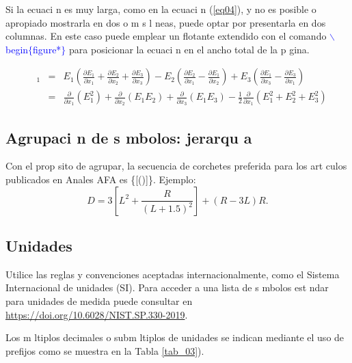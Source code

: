 \documentclass{article}
\begin{document}
Si la ecuaci n es muy larga, como en la ecuaci n (\ref{eq04}), y no es posible o apropiado mostrarla en dos o m s l neas, puede optar por presentarla en dos columnas. En este caso puede emplear un flotante extendido con el comando \textcolor{Blue}{\textsf{$\backslash$begin$\{$figure*$\}$}}
para posicionar la ecuaci n en el ancho total de la p gina.

\begin{figure}
\begin{eqnarray}
[\mathbf{E}(\mathbf{\nabla . E}) - \mathbf{E}\times (\mathbf{\nabla \times E})]_{1}  & = & 
E_{1}\left( \frac{\partial E_{1}}{\partial x_{1}} +  \frac{\partial E_{2}}{\partial x_{2}} + \frac{\partial E_{3}}{\partial x_{3}} \right) 
- E_{2}\left( \frac{\partial E_{2}}{\partial x_{1}} -  \frac{\partial E_{1}}{\partial x_{2}} \right)
+ E_{3}\left( \frac{\partial E_{1}}{\partial x_{3}} -  \frac{\partial E_{3}}{\partial x_{1}} \right)
\nonumber\\
 & = & \frac{\partial}{\partial x_{1}}(E_{1}^{2}) + \frac{\partial}{\partial x_{2}}(E_{1}E_{2}) + \frac{\partial}{\partial x_{3}}(E_{1}E_{3}) - \frac{1}{2}\frac{\partial}{\partial x_{1}}(E_{1}^{2}+E_{2}^{2}+E_{3}^{2})
\label{eq04}
\end{eqnarray}
\end{figure}

\subsection{Agrupaci n de s mbolos: jerarqu a}

Con el prop sito de agrupar, la secuencia de corchetes preferida para los art culos publicados en Anales AFA es \large{\{[()]\}}. \normalsize Ejemplo:
\begin{equation}
D=3\left[L^{2}+\frac{R}{(L+1.5)^{2}}\right]+(R-3L)R. 
\label{eq05}
\end{equation}

\subsection{Unidades}

Utilice las reglas y convenciones aceptadas internacionalmente, como el Sistema Internacional de unidades (SI). Para acceder a una lista de s mbolos est ndar para unidades de medida  puede  consultar en \url{https://doi.org/10.6028/NIST.SP.330-2019}.

Los m ltiplos decimales o subm ltiplos de unidades se indican mediante el uso de prefijos como se muestra en la Tabla \ref{tab_03}).
\end{document}
